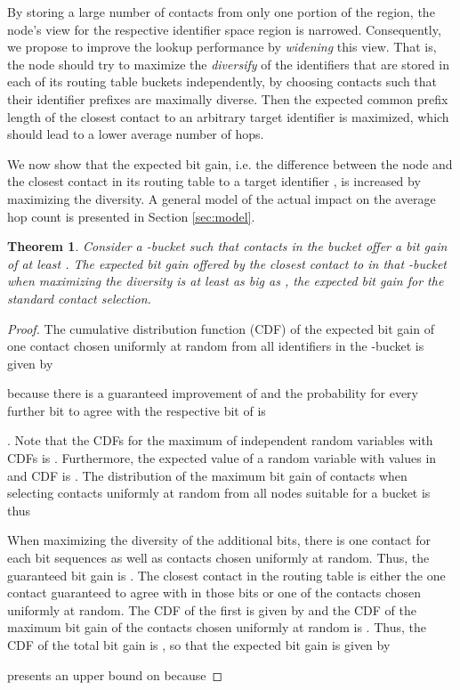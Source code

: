 \documentclass[10pt, conference, compsocconf, letterpaper]{IEEEtran}
\newtheorem{theorem}{Theorem}
\begin{document}
By storing a large number of contacts from only one portion of the region, the node's view for the respective identifier space region is  narrowed.
Consequently, we propose to improve the lookup performance by \emph{widening} this view. That is, the node should try to maximize the \emph{diversify} of the identifiers that are stored in each of its routing table buckets independently, 
by choosing contacts such that their identifier prefixes are maximally diverse. Then the expected common prefix length of the closest contact to an arbitrary target identifier is maximized, which should lead to a lower average number of hops.

We now show that the expected bit gain, i.e. the difference between the node and
the closest contact in its routing table to a target identifier , is increased by maximizing the diversity. A general model of the actual impact on the average hop count is presented in Section \ref{sec:model}.
\begin{theorem}
 \label{thm:bitgain}
Consider a -bucket such that contacts in the bucket offer a bit gain of at least . 
 The expected
bit gain  offered by the closest contact to  in that -bucket when maximizing
the diversity  is at least as big as , the expected bit gain for the standard contact selection.\end{theorem}  
\begin{proof}
The cumulative distribution function (CDF) of the expected bit gain of one contact chosen uniformly at random
from all identifiers in the -bucket is given by 

because there is a guaranteed improvement of 
and the probability for every further bit to agree with the respective bit of  is \begin{footnotesize}\end{footnotesize}.
Note that the CDFs for the maximum of independent random variables 
with CDFs  is .
Furthermore, the expected value of a random variable  with values in  and CDF  is
.
The distribution of the maximum bit gain of  contacts when selecting contacts uniformly at random from all nodes
suitable for a bucket is thus

When maximizing the diversity of the  additional bits,
there is one contact for each  bit sequences as well as  contacts 
chosen uniformly at random.
Thus, the guaranteed bit gain is . The closest contact in the routing
table is either the one contact guaranteed to agree with 
in those  bits or one of the contacts chosen uniformly at random.
The CDF of the first is given by  and the CDF of the
maximum bit gain of the contacts chosen uniformly at random is .
Thus, the CDF of the total bit gain is ,
so that the expected bit gain is given by 

 presents an upper bound on  because 
 \end{proof}
\end{document}
